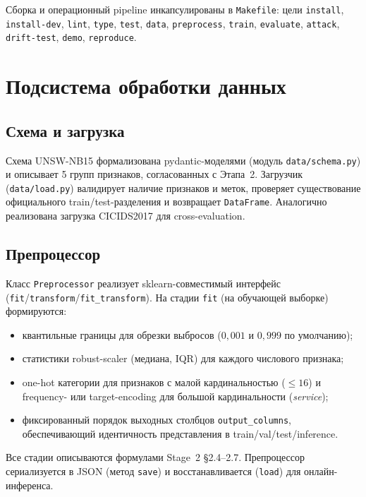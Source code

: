\documentclass[14pt, a4paper]{extarticle}
\begin{document}
Сборка и операционный pipeline инкапсулированы в \texttt{Makefile}: цели
\texttt{install}, \texttt{install-dev}, \texttt{lint}, \texttt{type},
\texttt{test}, \texttt{data}, \texttt{preprocess}, \texttt{train},
\texttt{evaluate}, \texttt{attack}, \texttt{drift-test}, \texttt{demo},
\texttt{reproduce}.

\section{Подсистема обработки данных}

\subsection{Схема и загрузка}

Схема UNSW-NB15 формализована pydantic-моделями (модуль
\texttt{data/schema.py}) и описывает 5 групп признаков, согласованных с
 Этапа~2. Загрузчик
(\texttt{data/load.py}) валидирует наличие признаков и меток, проверяет
существование официального train/test-разделения и возвращает
\texttt{DataFrame}. Аналогично реализована загрузка CICIDS2017 для
cross-evaluation.

\subsection{Препроцессор}

Класс \texttt{Preprocessor} реализует sklearn-совместимый интерфейс
(\texttt{fit}/\texttt{transform}/\texttt{fit\_transform}). На стадии
\texttt{fit} (на обучающей выборке) формируются:

\begin{itemize}
    \item квантильные границы для обрезки выбросов
    (\(0{,}001\) и \(0{,}999\) по умолчанию);
    \item статистики robust-scaler (медиана, IQR) для каждого числового
    признака;
    \item one-hot категории для признаков с малой кардинальностью
    (\(\leq 16\)) и frequency- или target-encoding для большой кардинальности
    (\emph{service});
    \item фиксированный порядок выходных столбцов \texttt{output\_columns},
    обеспечивающий идентичность представления в train/val/test/inference.
\end{itemize}

Все стадии описываются формулами Stage~2 §2.4--2.7. Препроцессор
сериализуется в JSON (метод \texttt{save}) и восстанавливается
(\texttt{load}) для онлайн-инференса.
\end{document}
